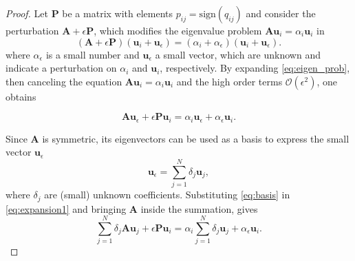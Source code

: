 \documentclass[journal]{IEEEtran}
\def\u{{\mathbf u}}
\def\A{{\mathbf A}}
\begin{document}
\begin{proof}
Let $\mathbf{P}$ be a matrix with elements $p_{ij} = \text{sign}(q_{ij})$ and consider the perturbation $\A + \epsilon \mathbf{P}$, which modifies the eigenvalue problem $\A \u_i = \alpha_i \u_i$ in 
\begin{equation}
\label{eq:eigen_prob}
    (\A + \epsilon \mathbf{P})(\u_i + \u_{\epsilon}) = (\alpha_i + \alpha_{\epsilon}) (\u_i + \u_{\epsilon}).
\end{equation}
where $\alpha_{\epsilon}$ is a small number and $\u_{\epsilon}$ a small vector, which are unknown and indicate a  perturbation on $\alpha_i$ and $\u_i$, respectively.
By expanding \eqref{eq:eigen_prob}, then canceling the equation $\A \u_i = \alpha_i \u_i$ and the high order terms $\mathcal{O}(\epsilon^2)$, one obtains

\begin{equation}
\label{eq:expansion1}
    \A\u_{\epsilon} + \epsilon \mathbf{P}\u_i = \alpha_i \u_{\epsilon} + \alpha_{\epsilon}\u_i.
\end{equation}

Since $\A$ is symmetric, its eigenvectors can be used as a basis to express the small vector $\u_{\epsilon}$
\begin{equation}
    \label{eq:basis}
    \u_{\epsilon} = \sum \limits_{j=1}^N \delta_j \u_j,
\end{equation}
where $\delta_j$ are (small) unknown coefficients. 
Substituting \eqref{eq:basis} in \eqref{eq:expansion1} and bringing $\A$ inside the summation, gives
\begin{equation}
    \label{eq:expansion2}
    \sum \limits_{j=1}^N \delta_j \A \u_j + \epsilon \mathbf{P}\u_i =   \alpha_i \sum \limits_{j=1}^N \delta_j \u_j + \alpha_{\epsilon}\u_i.
\end{equation}


\end{proof}
\end{document}

